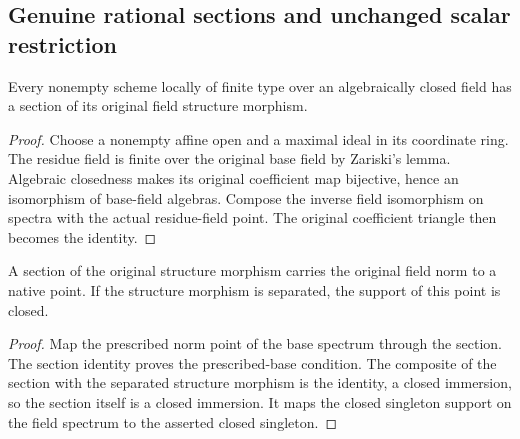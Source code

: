 \subsection{Genuine rational sections and unchanged scalar restriction}

\begin{lemma}
\label{lem:fc-actual-rational-section}
\leanok
Every nonempty scheme locally of finite type over an algebraically closed
field has a section of its original field structure morphism.
\end{lemma}
\begin{proof}
Choose a nonempty affine open and a maximal ideal in its coordinate ring.
The residue field is finite over the original base field by Zariski's lemma.
Algebraic closedness makes its original coefficient map bijective, hence an
isomorphism of base-field algebras. Compose the inverse field isomorphism on
spectra with the actual residue-field point. The original coefficient triangle
then becomes the identity.
\end{proof}

\begin{lemma}
\label{lem:fc-native-point-rational-section}
\leanok
A section of the original structure morphism carries the original field norm
to a native point. If the structure morphism is separated, the support of this
point is closed.
\end{lemma}
\begin{proof}
Map the prescribed norm point of the base spectrum through the section.
The section identity proves the prescribed-base condition. The composite of
the section with the separated structure morphism is the identity, a closed
immersion, so the section itself is a closed immersion. It maps the closed
singleton support on the field spectrum to the asserted closed singleton.
\end{proof}

